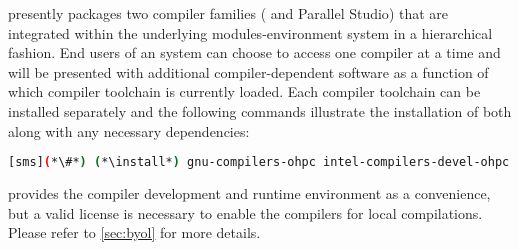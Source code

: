\OHPC{} presently packages two compiler families ({\GNU{}} and {\IntelR{}
  Parallel Studio}) that are integrated within the underlying
modules-environment system in a hierarchical fashion. End users of an \OHPC{}
system can choose to access one compiler at a time and will be presented with
additional compiler-dependent software as a function of which compiler
toolchain is currently loaded. Each compiler toolchain can be installed
separately and the following commands illustrate the installation of both along
with any necessary dependencies:

\begin{lstlisting}[language=bash]
[sms](*\#*) (*\install*) gnu-compilers-ohpc intel-compilers-devel-ohpc
\end{lstlisting}

\begin{center}
\begin{tcolorbox}[]
\small
\OHPC{} provides the \IntelR{} compiler development and runtime environment as a convenience, but a valid license
is necessary to enable the compilers for local compilations. Please refer to \ref{sec:byol} for more details.
\end{tcolorbox}
\end{center}
